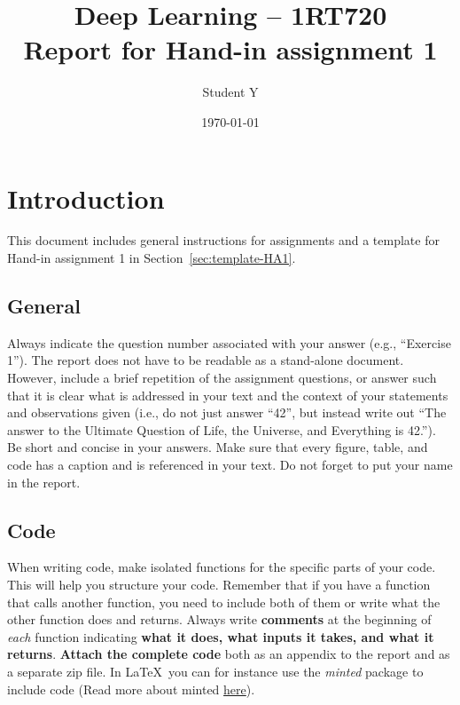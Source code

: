 \documentclass[a4paper,10pt]{article}
\title{\textbf{Deep Learning -- 1RT720} 
	\\ Report for Hand-in assignment 1}
\author{Student Y}
\date{\today}
\begin{document}
	
	\maketitle
	
	\section{Introduction}
	
	This document includes general instructions for assignments and a template for Hand-in assignment 1 in Section~\ref{sec:template-HA1}.
	
	\subsection*{General}
	
	Always indicate the question number associated with your answer (e.g., ``Exercise 1''). The report does not have to be readable as a stand-alone document. However, include a brief repetition of the assignment questions, or answer such that it is clear what is addressed in your text and the context of your statements and observations given (i.e., do not just answer ``42'', but instead write out ``The answer to the Ultimate Question of Life, the Universe, and Everything is 42.''\cite{Adams}). Be short and concise in your answers.
	Make sure that every figure, table, and code has a caption and is referenced in your text. Do not forget to put your name in the report.
	
	\subsection*{Code}
	When writing code, make isolated functions for the specific parts of your code. This will help you structure your code. 
	Remember that if you have a function that calls another function, you need to include both of them or write what the other function does and returns. 
	Always write \textbf{comments} at the beginning of \textit{each} function indicating \textbf{what it does, what inputs it takes, and what it returns}.
	\textbf{Attach the complete code} both as an appendix to the report and as a separate zip file. In \LaTeX\ you can for instance use the \emph{minted} package to include code 
	(Read more about minted \href{https://www.overleaf.com/learn/latex/Code_Highlighting_with_minted}{here}).
	
\end{document}

